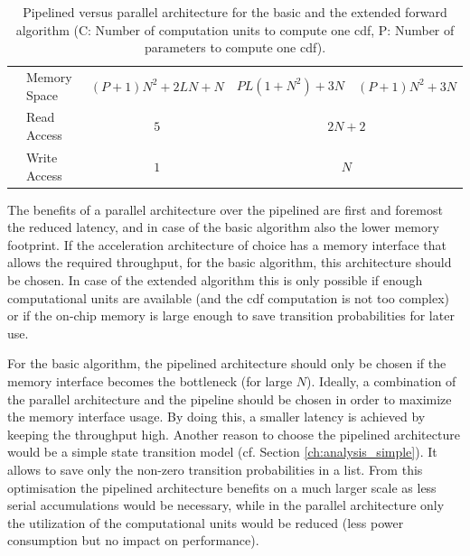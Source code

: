 \documentclass[mscthesis]{usiinfthesis}
\begin{document}
\begin{table}
\begin{center}
\begin{tabular}{|c|l|*{3}{c|}}
            \cline{2-5}
            & Memory Space
            & $(P+1)N^2+2LN+N$
            & $PL(1+N^2)+3N$ & $(P+1)N^2+3N$
            \\
            \cline{2-5}
            & Read Access
            & $5$
            & \multicolumn{2}{c|}{$2N+2$}
            \\
            \cline{2-5}
            & Write Access
            & $1$
            & \multicolumn{2}{c|}{$N$}
            \\
            \hline
        \end{tabular}
    \end{center}
    \caption{Pipelined versus parallel architecture for the basic and the
        extended forward algorithm (C: Number of computation units to compute
        one \acrshort{cdf}, P: Number of parameters to compute one
        \acrshort{cdf}).}
    \label{tab:summary_D}
\end{table}

The benefits of a parallel architecture over the pipelined are first and
foremost the reduced latency, and in case of the basic algorithm also the lower
memory footprint. If the acceleration architecture of choice has a memory
interface that allows the required throughput, for the basic algorithm, this
architecture should be chosen. In case of the extended algorithm this is only
possible if enough computational units are available (and the \gls{cdf}
computation is not too complex) or if the on-chip memory is large enough to
save transition probabilities for later use.

For the basic algorithm, the pipelined architecture should only be chosen if
the memory interface becomes the bottleneck (for large $N$). Ideally,
a combination of the parallel architecture and the pipeline should be chosen in
order to maximize the memory interface usage. By doing this, a smaller latency
is achieved by keeping the throughput high. Another reason to choose the
pipelined architecture would be a simple state transition model (cf. Section
\ref{ch:analysis_simple}). It allows to save only the non-zero transition
probabilities in a list. From this optimisation the pipelined architecture
benefits on a much larger scale as less serial accumulations would be
necessary, while in the parallel architecture only the utilization of the
computational units would be reduced (less power consumption but no impact on
performance).
\end{document}
